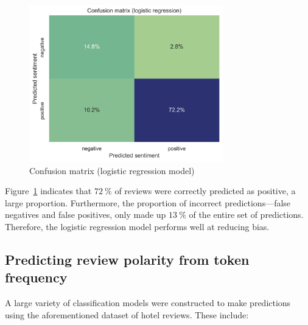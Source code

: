 \documentclass[11pt, a4paper]{pancake-article}
\begin{document}
\begin{figure}
  \begin{center}
    \includegraphics[width=0.75\textwidth]{../results/logistic_confuse.png}
  \end{center}
  \caption{Confusion matrix (logistic regression
  model)}\label{fig:logistic-confuse}
\end{figure}

Figure~\ref{fig:logistic-confuse} indicates that $\qty{72}{\percent}$
of reviews were correctly predicted as positive, a large proportion.
Furthermore, the proportion of incorrect predictions---false
negatives and false positives, only made up
$\qty{13}{\percent}$ of the entire set of predictions. Therefore, the
logistic regression model performs
well at reducing bias.

\subsection{Predicting review polarity from token frequency}

A large variety of classification models were constructed to make
predictions using the aforementioned
dataset of hotel reviews. These include:
\end{document}
